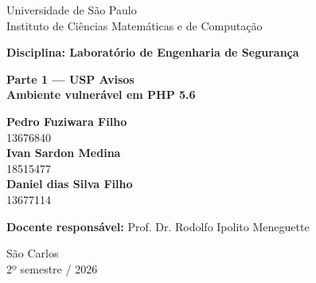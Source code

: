 \begin{titlepage}
    \begin{center}
        \vspace*{0.5cm}

        \Large
        Universidade de São Paulo\\
        Instituto de Ciências Matemáticas e de Computação

        \vspace{2cm}
        \LARGE
        \textbf{
            Disciplina: Laboratório de Engenharia de Segurança
        }

        \vspace{3.5cm}
        \Huge
        \textbf{Parte 1 --- USP Avisos\\
            Ambiente vulnerável em PHP 5.6}

        \LARGE

        \vfill
        \large
        \textbf{Pedro Fuziwara Filho}\\
        13676840\\
        \textbf{Ivan Sardon Medina}\\
        18515477\\
        \textbf{Daniel dias Silva Filho}\\
        13677114

        \textbf{Docente responsável:} Prof. Dr. Rodolfo Ipolito Meneguette
        \vspace{1cm}

        \Large
        São Carlos\\
        2º semestre / 2026

    \end{center}
\end{titlepage}
